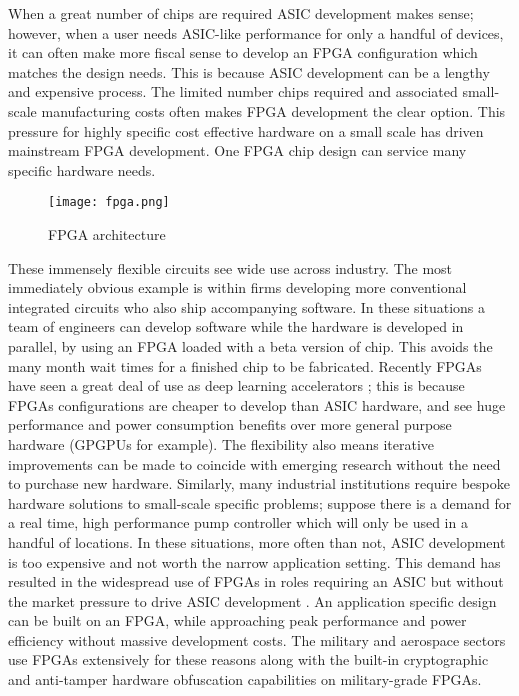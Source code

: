 When a great number of chips are required ASIC development makes sense; however, when a user needs
ASIC-like performance for only a handful of devices, it can often make more fiscal sense
to develop an FPGA configuration which matches the design needs.
This is because ASIC development can
be a lengthy and expensive process.
The limited number chips required and associated small-scale manufacturing
costs often makes FPGA development the clear option. This pressure for highly specific cost
effective hardware on a small scale
has driven mainstream FPGA development. One FPGA chip design can service many specific
hardware needs.

\begin{figure}
\centering
\texttt{[image: fpga.png]}
\caption{FPGA architecture}
\label{fig:fpga}
\end{figure}

These immensely flexible circuits see wide use across industry. The most immediately
obvious example is
within firms developing more conventional integrated circuits who also ship accompanying
software. In these situations a team of engineers can develop software
while the hardware is developed in parallel, by using an FPGA loaded with a beta version
of chip. This avoids the many month wait times for a finished chip to be fabricated.
Recently FPGAs have seen a great deal of use as deep learning accelerators
\cite{Zhang:2015:OFA:2684746.2689060}; this is because FPGAs
configurations are cheaper to develop than ASIC hardware,
and see huge performance and power consumption benefits over more general purpose
hardware (GPGPUs for example). The flexibility also means iterative improvements
can be made to coincide with emerging research without the need to purchase new
hardware. Similarly, many industrial institutions require
bespoke hardware solutions to small-scale specific problems; suppose there is a
demand for a real time, high performance
pump controller which will only be used in a handful of locations. In these situations,
more often than not, ASIC
development is too expensive and not worth the narrow application setting. This demand has resulted in
the widespread use of FPGAs
in roles requiring an ASIC but without the market pressure to drive ASIC development
\cite{4267891}.
An application specific design can be built on an FPGA, while approaching peak performance and power
efficiency without massive development costs.
The military \cite{1346835} and aerospace \cite{henaut2009fpga} sectors use FPGAs extensively for these reasons along with
the built-in cryptographic and anti-tamper hardware obfuscation capabilities on
military-grade FPGAs.

